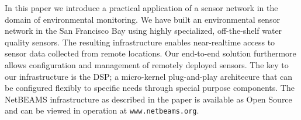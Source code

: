 \documentclass[conference]{IEEEtran}
\begin{document}
In this paper we introduce a practical application of a sensor network
in the domain of environmental monitoring. We have built an
environmental sensor network in the San Francisco Bay using highly
specialized, off-the-shelf water quality sensors. The resulting
infrastructure enables near-realtime access to sensor data collected
from remote locations. Our end-to-end solution furthermore allows
configuration and management of remotely deployed sensors. The key to
our infrastructure is the DSP; a micro-kernel plug-and-play
architecure that can be configured flexibly to specific needs through
special purpose components. The NetBEAMS infrastructure as described
in the paper is available as Open Source and can be viewed in
operation at \texttt{www.netbeams.org}.



\end{document}

